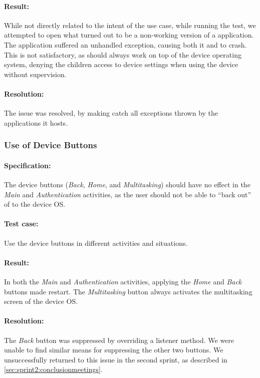 \paragraph{Result:} While not directly related to the intent of the use case, while running the test, we attempted to open what turned out to be a non-working version of a \giraf application. The application suffered an unhandled exception, causing both it and \launcher to crash. This is not satisfactory, as \launcher should always work on top of the device operating system, denying the children access to device settings when using the device without supervision.
\paragraph{Resolution:} The issue was resolved, by making \launcher catch all exceptions thrown by the \giraf applications it hosts.


\subsubsection{Use of Device Buttons}

\paragraph{Specification:} The device buttons (\textit{Back}, \textit{Home}, and \textit{Multitasking}) should have no effect in the \textit{Main} and \textit{Authentication} activities, as the user should not be able to ``back out'' of \launcher to the device OS.
\paragraph{Test case:} Use the device buttons in different activities and situations.
\paragraph{Result:} In both the \textit{Main} and \textit{Authentication} activities, applying the \textit{Home} and \textit{Back} buttons made \launcher restart. The \textit{Multitasking} button always activates the multitasking screen of the device OS.
\paragraph{Resolution:} The \textit{Back} button was suppressed by overriding a listener method. We were unable to find similar means for suppressing the other two buttons. We unsuccessfully returned to this issue in the second sprint, as described in \cref{sec:sprint2:conclusionmeetings}.